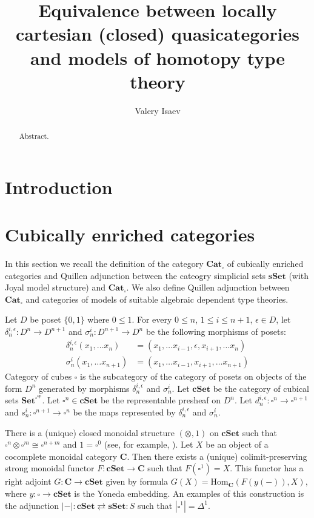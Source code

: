 \documentclass[reqno]{amsart}
\theoremstyle{definition}
\theoremstyle{remark}
\newcommand{\cat}[1]{\mathbf{#1}}
\newcommand{\C}{\cat{C}}
\newcommand{\Cat}{\cat{Cat}}
\newcommand{\Set}{\cat{Set}}
\newcommand{\sSet}{\cat{sSet}}
\newcommand{\cSet}{\cat{cSet}}
\newcommand{\Hom}{\mathrm{Hom}}
\numberwithin{figure}{section}
\begin{document}
\title[Equivalence between quasicategories and models of type theory]{Equivalence between locally cartesian (closed) quasicategories and models of homotopy type theory}

\author{Valery Isaev}

\begin{abstract}
Abstract.
\end{abstract}

\maketitle

\section{Introduction}

\section{Cubically enriched categories}

In this section we recall the definition of the category $\Cat_\square$ of cubically enriched categories and Quillen adjunction between
the cateogry simplicial sets $\sSet$ (with Joyal model structure) and $\Cat_\square$.
We also define Quillen adjunction between $\Cat_\square$ and categories of models of suitable algebraic dependent type theories.

Let $D$ be poset $\{0,1\}$ where $0 \leq 1$.
For every $0 \leq n$, $1 \leq i \leq n+1$, $\epsilon \in D$, let $\delta^{i,\epsilon}_n : D^n \to D^{n+1}$ and $\sigma^i_n : D^{n+1} \to D^n$ be the following morphisms of posets:
\begin{align*}
\delta^{i,\epsilon}_n(x_1, \ldots x_n) & = (x_1, \ldots x_{i-1}, \epsilon, x_{i+1}, \ldots x_n) \\
\sigma^i_n(x_1, \ldots x_{n+1}) & = (x_1, \ldots x_{i-1}, x_{i+1}, \ldots x_{n+1})
\end{align*}
Category of cubes $\square$ is the subcategory of the category of posets on objects of the form $D^n$ generated by morphisms $\delta^{i,\epsilon}_n$ and $\sigma^i_n$.
Let $\cSet$ be the category of cubical sets $\Set^{\square^{op}}$.
Let $\square^n \in \cSet$ be the representable presheaf on $D^n$.
Let $d^{i,\epsilon}_n : \square^n \to \square^{n+1}$ and $s^i_n : \square^{n+1} \to \square^n$ be the maps represented by $\delta^{i,\epsilon}_n$ and $\sigma^i_n$.

There is a (unique) closed monoidal structure $(\otimes,1)$ on $\cSet$ such that $\square^n \otimes \square^m \cong \square^{n+m}$ and $1 = \square^0$ (see, for example, \cite{jardine}).
Let $X$ be an object of a cocomplete monoidal category $\C$.
Then there exists a (unique) colimit-preserving strong monoidal functor $F : \cSet \to \C$ such that $F(\square^1) = X$.
This functor has a right adjoint $G : \C \to \cSet$ given by formula $G(X) = \Hom_\C(F(y(-)),X)$, where $y : \square \to \cSet$ is the Yoneda embedding.
An examples of this construction is the adjunction $|-| : \cSet \rightleftarrows \sSet : S$ such that $|\square^1| = \Delta^1$.
\end{document}
